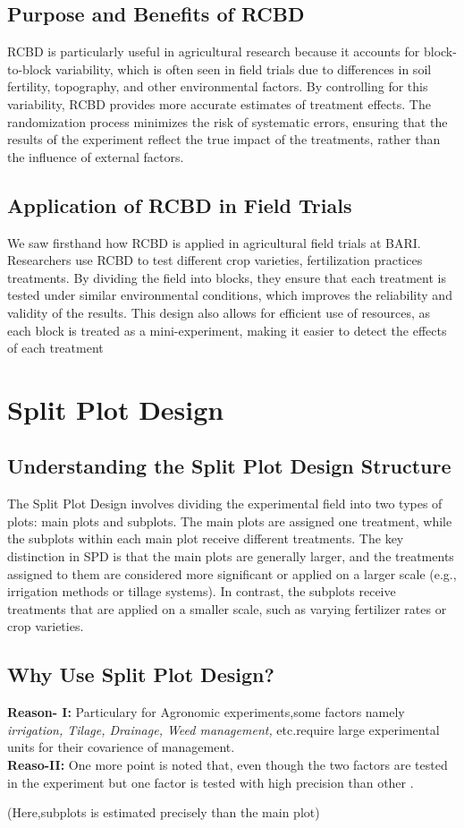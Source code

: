 \documentclass[oneside,12pt,fleqn]{book}
\begin{document}
\subsection{Purpose and Benefits of RCBD}
RCBD is particularly useful in agricultural research because it accounts for block-to-block variability, which is often seen in field trials due to differences in soil fertility, topography, and other environmental factors. By controlling for this variability, RCBD provides more accurate estimates of treatment effects. The randomization process minimizes the risk of systematic errors, ensuring that the results of the experiment reflect the true impact of the treatments, rather than the influence of external factors.
\subsection{Application of RCBD in Field Trials}
We saw firsthand how RCBD is applied in agricultural field trials at BARI. Researchers use RCBD to test different crop varieties, fertilization practices treatments. By dividing the field into blocks, they ensure that each treatment is tested under similar environmental conditions, which improves the reliability and validity of the results. This design also allows for efficient use of resources, as each block is treated as a mini-experiment, making it easier to detect the effects of each treatment


\section{Split Plot Design}
\subsection{Understanding the Split Plot Design Structure}
The Split Plot Design involves dividing the experimental field into two types of plots: main plots and subplots. The main plots are assigned one treatment, while the subplots within each main plot receive different treatments. The key distinction in SPD is that the main plots are generally larger, and the treatments assigned to them are considered more significant or applied on a larger scale (e.g., irrigation methods or tillage systems). In contrast, the subplots receive treatments that are applied on a smaller scale, such as varying fertilizer rates or crop varieties.
\subsection {Why Use Split Plot Design?}
\textbf{Reason- I:} Particulary for Agronomic experiments,some factors namely \textit{irrigation, Tilage, Drainage, Weed management,} etc.require large experimental units for their covarience of management.\\
\textbf{Reaso-II:} One more point is noted that, even though the two factors are tested in the experiment but one factor is tested with high precision than other .\\
\begin{center}
    (Here,subplots is estimated precisely than the main plot)
\end{center}
\end{document}
